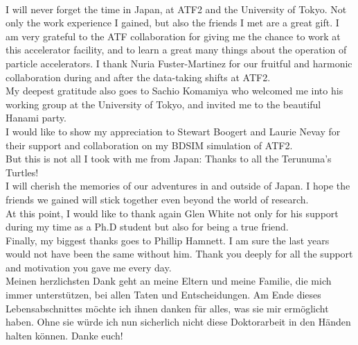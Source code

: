 \vspace*{0.2cm}\\
\noindent I will never forget the time in Japan, at ATF2 and the University of Tokyo.
Not only the work experience I gained, but also the friends I met are a great gift.
I am very grateful to the ATF collaboration for giving me the chance to work at this accelerator facility, and to learn a great many things about the operation of particle accelerators.
I thank Nuria Fuster-Martinez for our fruitful and harmonic collaboration during and after the data-taking shifts at ATF2.
\\My deepest gratitude also goes to Sachio Komamiya who welcomed me into his working group at the University of Tokyo, and invited me to the beautiful Hanami party.
\vspace*{0.2cm}\\
\noindent I would like to show my appreciation to Stewart Boogert and Laurie Nevay for their support and collaboration on my BDSIM simulation of ATF2.
\vspace*{0.2cm}\\
\noindent But this is not all I took with me from Japan: 
Thanks to all the Terunuma's Turtles!
\\I will cherish the memories of our adventures in and outside of Japan.
I hope the friends we gained will stick together even beyond the world of research.
\\At this point, I would like to thank again Glen White not only for his support during my time as a Ph.D student but also for being a true friend.
\vspace*{0.2cm}\\
\noindent Finally, my biggest thanks goes to Phillip Hamnett.
I am sure the last years would not have been the same without him.
Thank you deeply for all the support and motivation you gave me every day.
\vspace*{0.2cm}\\
\noindent Meinen herzlichsten Dank geht an meine Eltern und meine Familie, die mich immer unterst\"utzen, bei allen Taten und Entscheidungen.
Am Ende dieses Lebensabschnittes m\"ochte ich ihnen danken f\"ur alles, was sie mir erm\"oglicht haben.
Ohne sie w\"urde ich nun sicherlich nicht diese Doktorarbeit in den H\"anden halten k\"onnen.
Danke euch!